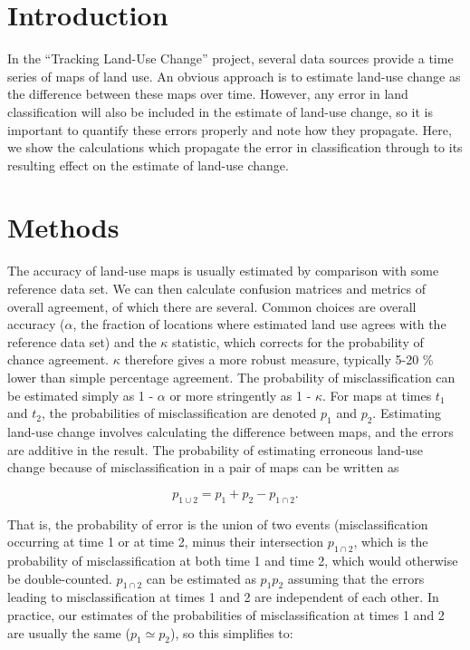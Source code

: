 \documentclass[
]{book}
\begin{document}
\hypertarget{introduction-4}{%
\section{Introduction}\label{introduction-4}}

In the ``Tracking Land-Use Change'' project, several data sources provide a time series of maps of land use. An obvious approach is to estimate land-use change as the difference between these maps over time. However, any error in land classification will also be included in the estimate of land-use change, so it is important to quantify these errors properly and note how they propagate.
Here, we show the calculations which propagate the error in classification through to its resulting effect on the estimate of land-use change.

\hypertarget{methods-3}{%
\section{Methods}\label{methods-3}}

The accuracy of land-use maps is usually estimated by comparison with some reference data set. We can then calculate confusion matrices and metrics of overall agreement, of which there are several. Common choices are overall accuracy (\(\alpha\), the fraction of locations where estimated land use agrees with the reference data set) and the \(\kappa\) statistic, which corrects for the probability of chance agreement. \(\kappa\) therefore gives a more robust measure, typically 5-20 \% lower than simple percentage agreement. The probability of misclassification can be estimated simply as 1 - \(\alpha\) or more stringently as 1 - \(\kappa\). For maps at times \(t_1\) and \(t_2\), the probabilities of misclassification are denoted \(p_1\) and \(p_2\). Estimating land-use change involves calculating the difference between maps, and the errors are additive in the result. The probability of estimating erroneous land-use change because of misclassification in a pair of maps can be written as

\begin{equation} \label{eq:probmis}
  p_{1 \cup 2} = p_1 + p_2 - p_{1 \cap 2}.
\end{equation}

That is, the probability of error is the union of two events (misclassification occurring at time 1 or at time 2, minus their intersection \(p_{1 \cap 2}\), which is the probability of misclassification at both time 1 and time 2, which would otherwise be double-counted. \(p_{1 \cap 2}\) can be estimated as \(p_1 p_2\) assuming that the errors leading to misclassification at times 1 and 2 are independent of each other.
In practice, our estimates of the probabilities of misclassification at times 1 and 2 are usually the same (\(p_1 \simeq p_2\)), so this simplifies to:
\end{document}
